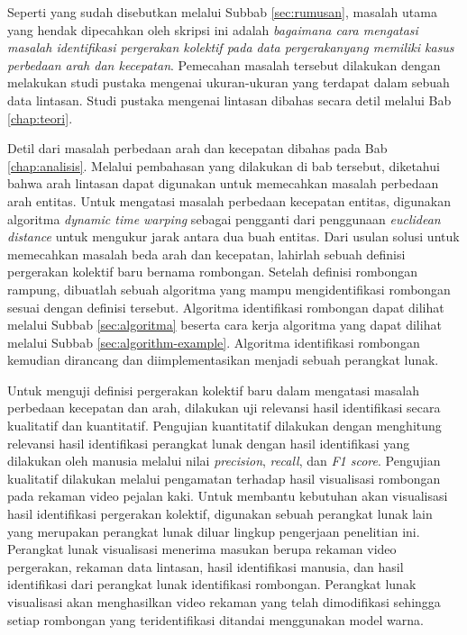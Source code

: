 Seperti yang sudah disebutkan melalui Subbab \ref{sec:rumusan}, masalah utama yang hendak dipecahkan oleh skripsi ini adalah \textit{bagaimana cara mengatasi masalah identifikasi pergerakan kolektif pada data pergerakanyang memiliki kasus perbedaan arah dan kecepatan}. Pemecahan masalah tersebut dilakukan dengan melakukan studi pustaka mengenai ukuran-ukuran yang terdapat dalam sebuah data lintasan. Studi pustaka mengenai lintasan dibahas secara detil melalui Bab \ref{chap:teori}.

Detil dari masalah perbedaan arah dan kecepatan dibahas pada Bab \ref{chap:analisis}. Melalui pembahasan yang dilakukan di bab tersebut, diketahui bahwa arah lintasan dapat digunakan untuk memecahkan masalah perbedaan arah entitas. Untuk mengatasi masalah perbedaan kecepatan entitas, digunakan algoritma \textit{dynamic time warping} sebagai pengganti dari penggunaan \textit{euclidean distance} untuk mengukur jarak antara dua buah entitas. Dari usulan solusi untuk memecahkan masalah beda arah dan kecepatan, lahirlah sebuah definisi pergerakan kolektif baru bernama rombongan. Setelah definisi rombongan rampung, dibuatlah sebuah algoritma yang mampu mengidentifikasi rombongan sesuai dengan definisi tersebut. Algoritma identifikasi rombongan dapat dilihat melalui Subbab \ref{sec:algoritma} beserta cara kerja algoritma yang dapat dilihat melalui Subbab \ref{sec:algorithm-example}. Algoritma identifikasi rombongan kemudian dirancang dan diimplementasikan menjadi sebuah perangkat lunak.

Untuk menguji definisi pergerakan kolektif baru dalam mengatasi masalah perbedaan kecepatan dan arah, dilakukan uji relevansi hasil identifikasi secara kualitatif dan kuantitatif. Pengujian kuantitatif dilakukan dengan menghitung relevansi hasil identifikasi perangkat lunak dengan hasil identifikasi yang dilakukan oleh manusia melalui nilai \textit{precision}, \textit{recall}, dan \textit{F1 score}. Pengujian kualitatif dilakukan melalui pengamatan terhadap hasil visualisasi rombongan pada rekaman video pejalan kaki. Untuk membantu kebutuhan akan visualisasi hasil identifikasi pergerakan kolektif, digunakan sebuah perangkat lunak lain yang merupakan perangkat lunak diluar lingkup pengerjaan penelitian ini. Perangkat lunak visualisasi menerima masukan berupa rekaman video pergerakan, rekaman data lintasan, hasil identifikasi manusia, dan hasil identifikasi dari perangkat lunak identifikasi rombongan. Perangkat lunak visualisasi akan menghasilkan video rekaman yang telah dimodifikasi sehingga setiap rombongan yang teridentifikasi ditandai menggunakan model warna.

